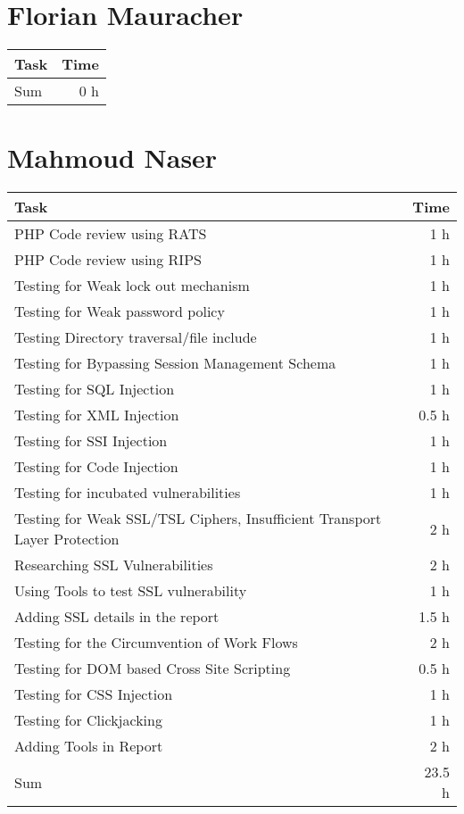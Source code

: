 \clearpage
\section*{Florian Mauracher}
\begin{table}[h!tpb]
  \centering
  \begin{tabularx}{\textwidth}{X r}
    \toprule
      Task & Time \\
    \midrule
    \midrule
      Sum & 0 h \\
    \bottomrule
  \end{tabularx}
\end{table}

\clearpage
\section*{Mahmoud Naser}
\begin{table}[h!tpb]
  \centering
  \begin{tabularx}{\textwidth}{X r}
    \toprule
      Task & Time \\
    \midrule
    PHP Code review using RATS & 1 h \\
    PHP Code review using RIPS & 1 h \\
    Testing for Weak lock out mechanism	& 1 h \\
    Testing for Weak password policy & 1 h \\
    Testing Directory traversal/file include & 1 h \\
    Testing for Bypassing Session Management Schema & 1 h \\
    Testing for SQL Injection & 1 h \\
    Testing for XML Injection & 0.5 h \\
    Testing for SSI Injection & 1 h \\
    Testing for Code Injection & 1 h \\
    Testing for incubated vulnerabilities & 1 h \\
    Testing for Weak SSL/TSL Ciphers, Insufficient Transport Layer Protection & 2 h \\
    Researching SSL Vulnerabilities & 2 h \\
    Using Tools to test SSL vulnerability & 1 h \\
    Adding SSL details in the report  & 1.5 h \\
    Testing for the Circumvention of Work Flows & 2 h \\
    Testing for DOM based Cross Site Scripting & 0.5 h \\
    Testing for CSS Injection & 1 h \\
    Testing for Clickjacking & 1 h \\
    Adding Tools in Report & 2 h \\
    \midrule
      Sum & 23.5 h \\
    \bottomrule
  \end{tabularx}
\end{table}
